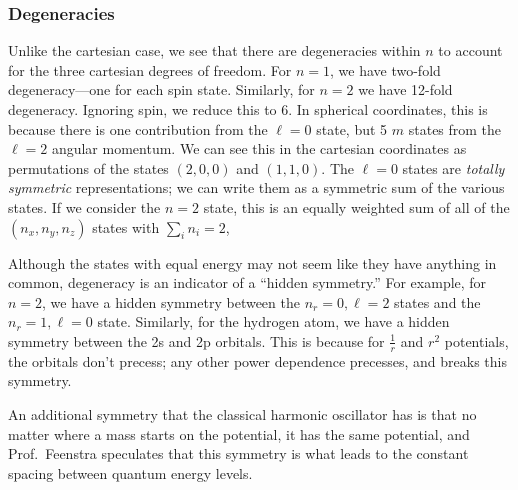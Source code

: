 \subsubsection{Degeneracies}
Unlike the cartesian case, we see that there are degeneracies within \(n\) to account for the three cartesian degrees of freedom. For \(n=1\), we have two-fold degeneracy---one for each spin state. Similarly, for \(n=2\) we have 12-fold degeneracy. Ignoring spin, we reduce this to 6. In spherical coordinates, this is because there is one contribution from the \(\ell = 0\) state, but 5 \(m\) states from the \(\ell=2\) angular momentum. We can see this in the cartesian coordinates as permutations of the states \((2,0,0)\) and \((1,1,0)\). The \(\ell=0\) states are \emph{totally symmetric} representations; we can write them as a symmetric sum of the various states. If we consider the \(n=2\) state, this is an equally weighted sum of all of the \((n_x,n_y, n_z)\) states with \(\sum_i n_i=2\),

Although the states with equal energy may not seem like they have anything in common, degeneracy is an indicator of a ``hidden symmetry.'' For example, for \(n=2\), we have a hidden symmetry between the \(n_r=0, \ell=2\) states and the \(n_r=1,\ell=0\) state. Similarly, for the hydrogen atom, we have a hidden symmetry between the 2s and 2p orbitals. This is because for \(\frac{1}{r}\) and \(r^2\) potentials, the orbitals don't precess; any other power dependence precesses, and breaks this symmetry.

An additional symmetry that the classical harmonic oscillator has is that no matter where a mass starts on the potential, it has the same potential, and Prof.\ Feenstra speculates that this symmetry is what leads to the constant spacing between quantum energy levels.
